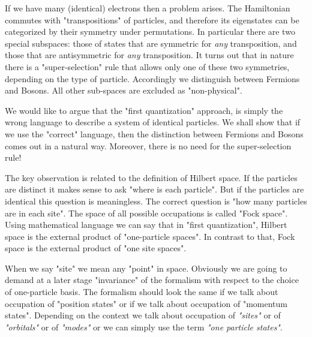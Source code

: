 \documentclass[onecolumn,fleqn]{revtex4}
\begin{document}
If we have many (identical) electrons then a problem 
arises. The Hamiltonian commutes with "transpositions" 
of particles, and therefore its eigenstates can be categorized 
by their symmetry under permutations. In particular there 
are two special subspaces: those of states that are symmetric 
for {\em any} transposition, and those that are antisymmetric 
for {\em any} transposition. It turns out that in nature 
there is a "super-selection" rule that allows only one 
of these two symmetries, depending on the type of particle. 
Accordingly we distinguish between Fermions and Bosons.
All other sub-spaces are excluded as "non-physical".     


We would like to argue that the "first quantization" approach, 
is simply the wrong language to describe a system of identical particles. 
We shall show that if we use the "correct" language, 
then the distinction between Fermions and Bosons comes out 
in a natural way. Moreover, there is no need for the super-selection rule!


The key observation is related to the definition of Hilbert space. 
If the particles are distinct it makes sense to ask 
"where is each particle". But if the particles are identical 
this question is meaningless. The correct question is 
"how many particles are in each site". The space of all possible 
occupations is called "Fock space". Using mathematical language 
we can say that in "first quantization", Hilbert space is the 
external product of "one-particle spaces". In contrast to that, 
Fock space is the external product of "one site spaces".


When we say "site" we mean any "point" in space. Obviously we 
are going to demand at a later stage "invariance" 
of the formalism with respect to the choice of one-particle basis. 
The formalism should look the same if we talk about occupation of 
"position states" or if we talk about occupation 
of "momentum states". Depending on the context we 
talk about occupation of {\em "sites"} or of {\em "orbitals"} 
or of {\em "modes"} or we can simply use the term {\em "one particle states"}.    
\end{document}
